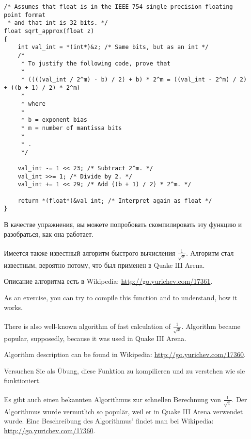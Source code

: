 \begin{lstlisting}[caption=\DE{Quellcode stammt aus der Wikipedia}\EN{The source code is taken from
Wikipedia}\RU{Исходный код взят из Wikipedia}\FR{Le code source provient de Wikipedia}\JPN{ソースコードはウィキペディアから取りました}:
\url{http://go.yurichev.com/17364},style=customc] /* Assumes that float is in the IEEE 754 single precision floating point format
 * and that int is 32 bits. */
float sqrt_approx(float z)
{
    int val_int = *(int*)&z; /* Same bits, but as an int */
    /*
     * To justify the following code, prove that
     *
     * ((((val_int / 2^m) - b) / 2) + b) * 2^m = ((val_int - 2^m) / 2) + ((b + 1) / 2) * 2^m)
     *
     * where
     *
     * b = exponent bias
     * m = number of mantissa bits
     *
     * .
     */
 
    val_int -= 1 << 23; /* Subtract 2^m. */
    val_int >>= 1; /* Divide by 2. */
    val_int += 1 << 29; /* Add ((b + 1) / 2) * 2^m. */
 
    return *(float*)&val_int; /* Interpret again as float */
}
\end{lstlisting}

\ifdefined\RUSSIAN
В качестве упражнения, вы можете попробовать скомпилировать эту функцию и разобраться, как она работает. \\
\\
Имеется также известный алгоритм быстрого вычисления $\frac{1}{\sqrt{x}}$.
Алгоритм стал известным, вероятно потому, что был применен в Quake III Arena.

Описание алгоритма есть в Wikipedia: \url{http://go.yurichev.com/17361}.
\fi %

\ifdefined\ENGLISH
As an exercise, you can try to compile this function and to understand, how it works. \\
\\
There is also well-known algorithm of fast calculation of $\frac{1}{\sqrt{x}}$.
Algorithm became popular, supposedly, because it was used in Quake III Arena.

Algorithm description can be found in Wikipedia: \url{http://go.yurichev.com/17360}.
\fi %

\ifdefined\GERMAN
Versuchen Sie als Übung, diese Funktion zu kompilieren und zu verstehen wie sie funktioniert.\\\\
Es gibt auch einen bekannten Algorithmus zur schnellen Berechnung von $\frac{1}{\sqrt{x}}$.
Der Algorithmus wurde vermutlich so populär, weil er in Quake III Arena verwendet wurde.
Eine Beschreibung des Algorithmus' findet man bei Wikipedia: \url{http://go.yurichev.com/17360}.
\fi %

